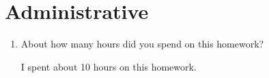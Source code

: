 \documentclass{article}
\begin{document}
\section*{Administrative}
\begin{aprob}
\begin{enumerate}
    \item {} About how many hours did you spend on this homework?
    
    I spent about 10 hours on this homework.
\end{enumerate}
\end{aprob}
\end{document}
